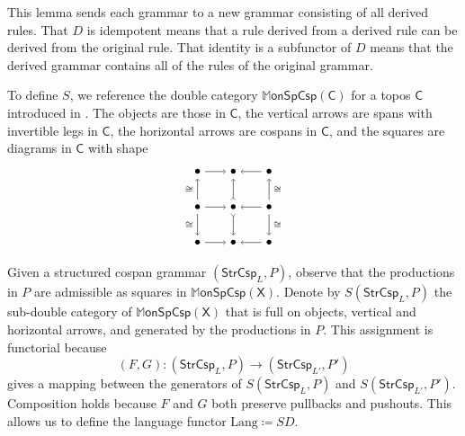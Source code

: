 \documentclass{amsart}
\newcommand{\C}{\cat{C}}
\newcommand{\X}{\cat{X}}
\newcommand{\StrCsp}{\cat{StrCsp}}
\newcommand{\MonSpCsp}{\dblcat{M} \cat{onSpCsp}}
\newcommand{\Lang}{\mathrm{Lang}}
\newcommand{\cat}[1]{\mathsf{#1}}
\newcommand{\dblcat}[1]{\mathbb{#1}}
\newcommand{\from}{\colon}
\theoremstyle{remark}
\theoremstyle{definition}
\begin{document}
This lemma sends each grammar to a new grammar consisting of all
derived rules.  That $ D $ is idempotent means that a rule derived
from a derived rule can be derived from the original rule.  That
identity is a subfunctor of $ D $ means that the derived grammar
contains all of the rules of the original grammar.

To define $ S $, we reference the double category $ \MonSpCsp (\C) $
for a topos $ \C $ introduced in \cite{CicCour_SpCspTopos}.  The
objects are those in $ \C $, the vertical arrows are spans with
invertible legs in $ \C $, the horizontal arrows are cospans in
$ \C $, and the squares are diagrams in $ \C $ with shape
%
\[
\begin{tikzpicture}
  \node (00) at (0,0) {$ \bullet $};
  \node (01) at (0,1) {$ \bullet $};
  \node (02) at (0,2) {$ \bullet $};
  \node (10) at (1,0) {$ \bullet $};
  \node (11) at (1,1) {$ \bullet $};
  \node (12) at (1,2) {$ \bullet $};
  \node (20) at (2,0) {$ \bullet $};
  \node (21) at (2,1) {$ \bullet $};
  \node (22) at (2,2) {$ \bullet $};
  \draw [->] (02) to node [] {\scriptsize{$  $}} (12);
  \draw [->] (22) to node [] {\scriptsize{$  $}} (12);
  \draw [->] (01) to node [] {\scriptsize{$  $}} (11);
  \draw [->] (21) to node [] {\scriptsize{$  $}} (11);
  \draw [->] (00) to node [] {\scriptsize{$  $}} (10);
  \draw [->] (20) to node [] {\scriptsize{$  $}} (10);
  \draw [->] (01) to node [left] {\scriptsize{$ \cong  $}} (02);
  \draw [->] (01) to node [left] {\scriptsize{$ \cong $}} (00);
  \draw [>->] (11) to node [] {\scriptsize{$  $}} (12);
  \draw [>->] (11) to node [] {\scriptsize{$  $}} (10);
  \draw [->] (21) to node [right] {\scriptsize{$ \cong $}} (22);
  \draw [->] (21) to node [right] {\scriptsize{$ \cong $}} (20);
\end{tikzpicture}
\]
%

Given a structured cospan grammar $ ( \StrCsp_L , P ) $, observe that
the productions in $ P $ are admissible as squares in
$ \MonSpCsp (\X) $. Denote by $ S ( \StrCsp_L , P ) $ the sub-double
category of $ \MonSpCsp ( \X ) $ that is full on objects, vertical and
horizontal arrows, and generated by the productions in
$ P $. This assignment is functorial
%
%
because
%
\[
  (F,G) \from ( \StrCsp_{L} , P ) \to ( \StrCsp_{L'} , P' )
\]
% 
gives a mapping between the generators of $ S ( \StrCsp_{L} , P ) $
and $ S ( \StrCsp_{L'} , P' ) $.  Composition holds because
$ F $ and $ G $ both preserve pullbacks and pushouts. This allows
us to define the language functor $ \Lang \coloneqq SD $.  
\end{document}
